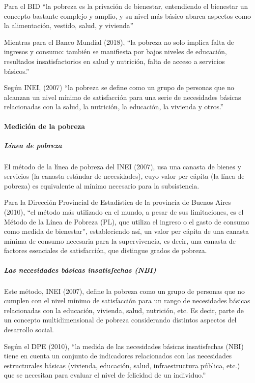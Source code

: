 Para el BID “la pobreza es la privación de bienestar, entendiendo el bienestar un concepto bastante complejo y amplio, y su nivel más básico abarca aspectos como la alimentación, vestido, salud, y vivienda”

Mientras para el Banco Mundial (2018), “la pobreza no solo implica falta de ingresos y consumo: también se manifiesta por bajos niveles de educación, resultados insatisfactorios en salud y nutrición, falta de acceso a servicios básicos.” 

Según INEI, (2007) “la pobreza se define como un grupo de personas que no alcanzan un nivel mínimo de satisfacción para una serie de necesidades básicas relacionadas con la salud, la nutrición, la educación, la vivienda y otros.”


    \paragraph{Medición de la pobreza}

  \subparagraph{Línea de pobreza}

El método de la línea de pobreza del INEI (2007), usa una canasta de bienes y servicios (la canasta estándar de necesidades), cuyo valor per cápita (la línea de pobreza) es equivalente al mínimo necesario para la subsistencia. 

Para la Dirección Provincial de Estadística de la provincia de Buenos Aires (2010), “el método más utilizado en el mundo, a pesar de sus limitaciones, es el Método de la Línea de Pobreza (PL), que utiliza el ingreso o el gasto de consumo como medida de bienestar”, estableciendo así, un valor per cápita de una canasta mínima de consumo necesaria para la supervivencia, es decir, una canasta de factores esenciales de satisfacción, que distingue grados de pobreza.


  \subparagraph{Las necesidades básicas insatisfechas (NBI)}

Este método, INEI (2007), define la pobreza como un grupo de personas que no cumplen con el nivel mínimo de satisfacción para un rango de necesidades básicas relacionadas con la educación, vivienda, salud, nutrición, etc. Es decir, parte de un concepto multidimensional de pobreza considerando distintos aspectos del desarrollo social.

Según el DPE (2010), “la medida de las necesidades básicas insatisfechas (NBI) tiene en cuenta un conjunto de indicadores relacionados con las necesidades estructurales básicas (vivienda, educación, salud, infraestructura pública, etc.) que se necesitan para evaluar el nivel de felicidad de un individuo.”



